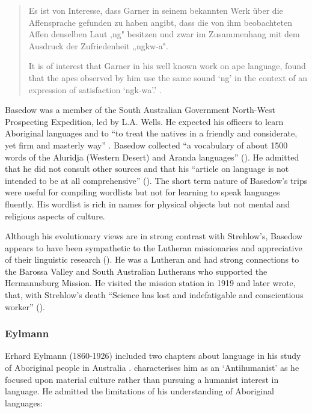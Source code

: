 \documentclass[output=paper]{langsci/langscibook}
\begin{document}
\begin{quote}
    Es ist von Interesse, dass Garner in seinem bekannten Werk über die Affensprache gefunden zu haben angibt, dass die von ihm beobachteten Affen denselben Laut ,ng" besitzen und zwar im Zusammenhang mit dem Ausdruck der Zufriedenheit „ngkw-a". 

    It is of interest that Garner in his well known work on ape language, found that the apes observed by him use the same sound ‘ng’ in the context of an expression of satisfaction ‘ngk-wa’.’ \citep[208]{basedow_vergleichende_1908}.
\end{quote}

Basedow was a member of the South Australian Government North-West Prospecting Expedition, led by L.A. Wells. He expected his officers to learn Aboriginal languages and to “to treat the natives in a friendly and considerate, yet firm and masterly way” \citep[49]{zogbaum_changing_2010}. Basedow collected “a vocabulary of about 1500 words of the Aluridja (Western Desert) and Aranda languages” (\citealt[v]{harmstorf_introduction_2004}). He admitted that he did not consult other sources and that his “article on language is not intended to be at all comprehensive” (\citealt[xii]{basedow_australian_1925}). The short term nature of Basedow’s trips were useful for compiling wordlists but not for learning to speak languages fluently. His wordlist \citep{basedow_vergleichende_1908} is rich in names for physical objects but not mental and religious aspects of culture. 

Although his evolutionary views are in strong contrast with Strehlow’s, Basedow appears to have been sympathetic to the Lutheran missionaries and appreciative of their linguistic research (\citealt[vi]{harmstorf_introduction_2004}). He was a Lutheran and had strong connections to the Barossa Valley and South Australian Lutherans who supported the Hermannsburg Mission. He visited the mission station in 1919 and later wrote, that, with Strehlow’s death “Science has lost and indefatigable and conscientious worker” (\citealt[ix]{basedow_australian_1925}). 

\subsubsection{Eylmann}

Erhard Eylmann (1860-1926) included two chapters about language in his study of Aboriginal people in Australia \citep{eylmann_eingeborenen_1908}. \citet[34]{monteath_globalising_2013} characterises him as an ‘Antihumanist’ as he focused upon material culture rather than pursuing a humanist interest in language. He admitted the limitations of his understanding of Aboriginal languages:
\end{document}
